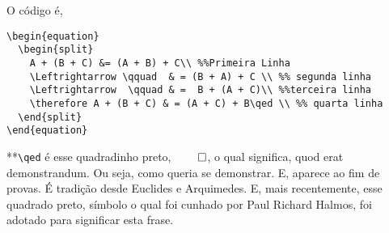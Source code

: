\documentclass[12pt,
brazilian,
a5paper]{abntex2} %
\begin{document}
    O código é,

\begin{verbatim}
\begin{equation}
  \begin{split}
    A + (B + C) &= (A + B) + C\\ %%Primeira Linha
    \Leftrightarrow \qquad  & = (B + A) + C \\ %% segunda linha
    \Leftrightarrow  \qquad & =  B + (A + C)\\ %%terceira linha
    \therefore A + (B + C) & = (A + C) + B\qed \\ %% quarta linha
  \end{split}
\end{equation}
\end{verbatim}

    **\verb+\qed+ é esse quadradinho preto, $\qed$, o qual significa,
    \textrm{quod erat demonstrandum}. Ou seja, como queria se
    demonstrar. E, aparece ao fim de provas. É tradição desde Euclides e
    Arquimedes. E, mais recentemente, esse quadrado preto, símbolo o qual foi cunhado
    por Paul Richard Halmos, foi adotado para significar esta frase.



  
\end{document}
